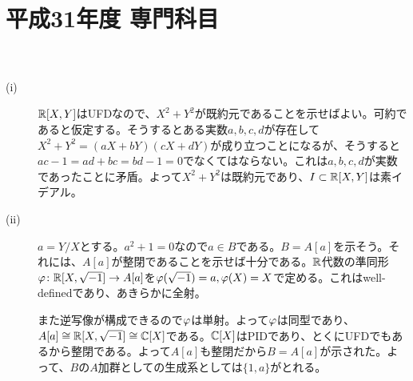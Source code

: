 \section{平成31年度 専門科目}

\subsubsection{} %
\begin{sol} ${}$
  \begin{description}
    \item[(i)] ${\mathbb R}[X,Y]$はUFDなので、$X^2 + Y^2$が既約元であることを示せばよい。可約であると仮定する。そうするとある実数$a,b,c,d $が存在して$X^2 + Y^2 = (aX + bY)(cX + dY)$が成り立つことになるが、そうすると$ac - 1 = ad + bc = bd - 1 = 0$でなくてはならない。これは$a,b,c,d$が実数であったことに矛盾。よって$X^2 + Y^2$は既約元であり、$I \subset {\mathbb R}[X,Y]$は素イデアル。
    \item[(ii)] $a = Y/X$とする。$a^2 + 1 = 0$なので$a \in B$である。$B = A[a]$を示そう。それには、$A[a]$が整閉であることを示せば十分である。${\mathbb R}$代数の準同形${\varphi} \colon {\mathbb R}[X,\sqrt{-1}] \to A[a]$を${\varphi}(\sqrt{-1})=a, {\varphi}(X)=X$で定める。これはwell-definedであり、あきらかに全射。

    また逆写像が構成できるので${\varphi}$は単射。よって${\varphi}$は同型であり、$A[a] \cong {\mathbb R}[X,\sqrt{-1}] \cong {\mathbb C}[X]$である。${\mathbb C}[X]$はPIDであり、とくにUFDでもあるから整閉である。よって$A[a]$も整閉だから$B = A[a]$が示された。よって、$B$の$A$加群としての生成系としては$\{ 1, a \}$がとれる。
  \end{description}
\end{sol}


\newpage

